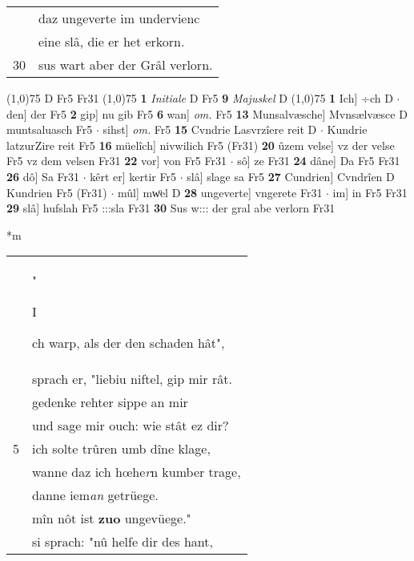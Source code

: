 \documentclass[8pt,a4paper,notitlepage]{article}
\begin{document}
\begin{table}[ht]
\begin{minipage}[t]{0.5\linewidth}
\begin{tabular}{rl}
 & daz ungeverte im undervienc\\ 
 & eine slâ, die er het erkorn.\\ 
30 & sus wart aber der Grâl verlorn.\\ 
\end{tabular}
\scriptsize
\line(1,0){75} \newline
D Fr5 Fr31 \newline
\line(1,0){75} \newline
\textbf{1} \textit{Initiale} D Fr5  \textbf{9} \textit{Majuskel} D  \newline
\line(1,0){75} \newline
\textbf{1} Ich] ÷ch D  $\cdot$ den] der Fr5 \textbf{2} gip] nu gib Fr5 \textbf{6} wan] \textit{om.} Fr5 \textbf{13} Munsalvæsche] Mvnsælvæsce D muntsaluasch Fr5  $\cdot$ sihst] \textit{om.} Fr5 \textbf{15} Cvndrie Lasvrzîere reit D  $\cdot$ Kundrie latzurZire reit Fr5 \textbf{16} müelîch] nivwilich Fr5 (Fr31) \textbf{20} ûzem velse] vz der velse Fr5 vz dem velsen Fr31 \textbf{22} vor] von Fr5 Fr31  $\cdot$ sô] ze Fr31 \textbf{24} dâne] Da Fr5 Fr31 \textbf{26} dô] Sa Fr31  $\cdot$ kêrt er] kertir Fr5  $\cdot$ slâ] slage sa Fr5 \textbf{27} Cundrien] Cvndrîen D Kundrien Fr5 (Fr31)  $\cdot$ mûl] mwͦel D \textbf{28} ungeverte] vngerete Fr31  $\cdot$ im] in Fr5 Fr31 \textbf{29} slâ] hufslah Fr5 :::sla Fr31 \textbf{30} Sus w::: der gral abe verlorn Fr31 \newline
\end{minipage}
\hspace{0.5cm}
\begin{minipage}[t]{0.5\linewidth}
\small
\begin{center}*m
\end{center}
\begin{tabular}{rl}
 & "\begin{large}I\end{large}ch warp, als der den schaden hât",\\ 
 & sprach er, "liebiu niftel, gip mir rât.\\ 
 & gedenke rehter sippe an mir\\ 
 & und sage mir ouch: wie stât ez dir?\\ 
5 & ich solte trûren umb dîne klage,\\ 
 & wanne daz ich hœhe\textit{r}n kumber trage,\\ 
 & danne iem\textit{an} getrüege.\\ 
 & mîn nôt ist \textbf{zuo} ungevüege."\\ 
 & si sprach: "nû helfe dir des hant,\\ 

\end{tabular}
\end{minipage}
\end{table}
\end{document}
